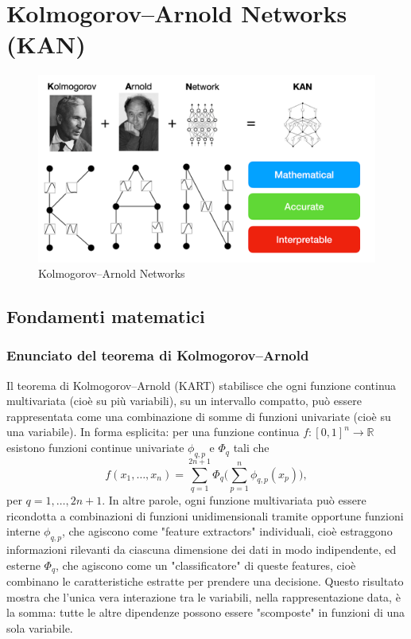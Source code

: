 \documentclass[a4paper,12pt]{report}
\begin{document}
	\chapter{Kolmogorov–Arnold Networks (KAN)}
	
	\begin{figure}[H]
		\centering
		\includegraphics[width=1.0\textwidth]{img/kan_1st_image.png}
		\caption{Kolmogorov–Arnold Networks}
	\end{figure}
	
	\section{Fondamenti matematici}
	
	\subsection{Enunciato del teorema di Kolmogorov--Arnold}
	Il teorema di Kolmogorov–Arnold (KART) stabilisce che ogni funzione continua multivariata (cioè su più variabili), su un intervallo compatto, può essere rappresentata come una combinazione di somme di funzioni univariate (cioè su una variabile). In forma esplicita: per una funzione continua \(f:[0,1]^n \to \mathbb{R}\) esistono funzioni continue univariate \(\phi_{q,p}\) e \(\Phi_q\) tali che
	\[
	f(x_1,\dots,x_n)=\sum_{q=1}^{2n+1}\Phi_q\!\Biggl(\sum_{p=1}^n \phi_{q,p}(x_p)\Biggr),
	\]
	per \(q=1,\dots,2n+1\). In altre parole, ogni funzione multivariata può essere ricondotta a combinazioni di funzioni unidimensionali tramite opportune funzioni interne \(\phi_{q,p}\), che agiscono come "feature extractors" individuali, cioè estraggono informazioni rilevanti da ciascuna dimensione dei dati in modo indipendente, ed esterne \(\Phi_q\), che agiscono come un "classificatore" di queste features, cioè combinano le caratteristiche estratte per prendere una decisione. Questo risultato mostra che l'unica vera interazione tra le variabili, nella rappresentazione data, è la somma: tutte le altre dipendenze possono essere "scomposte" in funzioni di una sola variabile.
	
\end{document}

